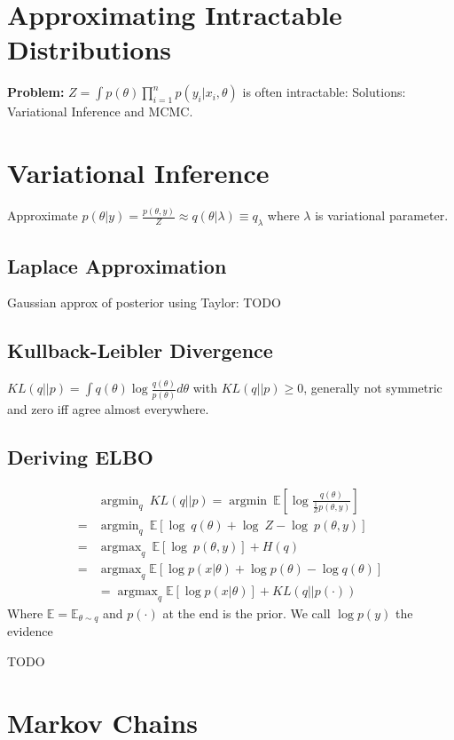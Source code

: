 \documentclass[11pt]{article}
\newcommand{\argmin}{\operatorname{argmin}}
\newcommand{\argmax}{\operatorname{argmax}}
\newcommand{\E}{\mathbb{E}}
\begin{document}
\begin{multicols*}{3}
	\section*{Approximating Intractable Distributions}
	\textbf{Problem:} $Z = \int p(\theta) \prod_{i=1}^{n} p(y_i| x_i, \theta)$ is often intractable: Solutions: Variational Inference and MCMC.
	
	\section*{Variational Inference}
	Approximate $p(\theta|y) = \frac{p(\theta, y)}{Z}\approx q(\theta| \lambda)\equiv q_\lambda$ where $\lambda$ is variational parameter.
	\subsection*{Laplace Approximation}
	Gaussian approx of posterior using Taylor: 
	TODO
	\subsection*{Kullback-Leibler Divergence}
	$KL(q||p) = \int q(\theta) \log \frac{q(\theta)}{p(\theta)} d\theta$ with $KL(q||p) \geq 0$, generally not symmetric and zero iff agree almost everywhere.
	
	\subsection*{Deriving ELBO}
	\begin{align*}
		&\argmin_q \ KL(q||p) = \argmin \ \E\left[ \log \frac{q(\theta)}{\frac{1}{Z} p(\theta,y)} \right]\\
	=& \argmin_q \  \E\left[ \log \ q(\theta) + \log \ Z - \log \ p(\theta,y) \right]\\
	=&  \argmax_q \ \E\left[ \log \ p(\theta,y) \right] + H(q)\\
	=& \argmax_q \E \left[ \log p(x| \theta) + \log p(\theta) - \log q(\theta) \right] \\
	&= \argmax_q \E \left[ \log p(x| \theta) \right] + KL(q||p(\cdot))
	\end{align*}
Where $\E = \E_{\theta \sim q}$ and $p(\cdot)$ at the end is the prior.
We call $\log p(y)$ the evidence

TODO


\section*{Markov Chains}


\end{multicols*}
\end{document}
